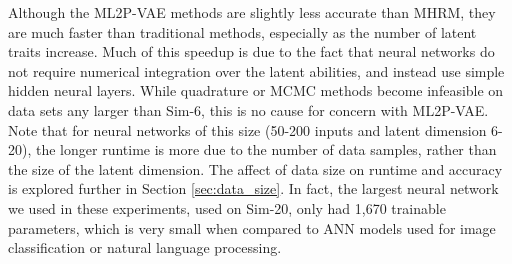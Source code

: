Although the ML2P-VAE methods are slightly less accurate than MHRM, they are much faster than traditional methods, especially as the number of latent traits increase. Much of this speedup is due to the fact that neural networks do not require numerical integration over the latent abilities, and instead use simple hidden neural layers. While quadrature or MCMC methods become infeasible on data sets any larger than Sim-6, this is no cause for concern with ML2P-VAE. Note that for neural networks of this size (50-200 inputs and latent dimension 6-20), the longer runtime is more due to the number of data samples, rather than the size of the latent dimension. The affect of data size on runtime and accuracy is explored further in Section \ref{sec:data_size}. In fact, the largest neural network we used in these experiments, used on Sim-20, only had 1,670 trainable parameters, which is very small when compared to ANN models used for image classification or natural language processing. 

